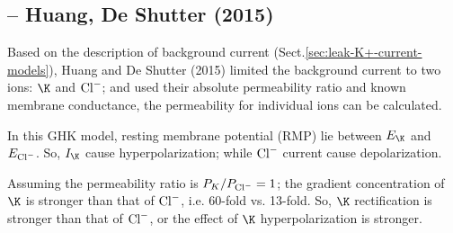 \subsection{-- Huang, De Shutter (2015)}
\label{sec:leak-K+channel-Huang-DeShutter-2015}

Based on the description of background current
(Sect.\ref{sec:leak-K+-current-models}), Huang and De Shutter (2015) limited the
background current to two ions: $\K$ and ${\text{Cl}^{-}}$; and used their
absolute permeability ratio and known membrane conductance, the permeability for
individual ions can be calculated.

In this GHK model, resting membrane potential (RMP) lie between $E_\K$ and
$E_{\text{Cl}^{-}}$. So, $I_\K$ cause hyperpolarization; while ${\text{Cl}^{-}}$ current cause
depolarization. 

Assuming the permeability ratio is $P_K/P_{\text{Cl}^{-}} = 1$; the gradient concentration
of $\K$ is stronger than that of ${\text{Cl}^{-}}$, i.e. 60-fold vs. 13-fold. So, $\K$
rectification is stronger than that of ${\text{Cl}^{-}}$, or the effect of $\K$
hyperpolarization is stronger. 
